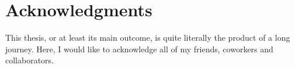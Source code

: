 \chapter{Acknowledgments}
%
\def\spacer{%
    \vspace*{-0.3\baselineskip}%
    \foreach \n in {1,2,...,105}{%
        \hspace*{0.01\linewidth}%
        \allowbreak%
        }%
    }

%
This thesis, or at least its main outcome, is quite literally the product of a long journey.
%
Here, I would like to acknowledge all of my friends, coworkers and collaborators.